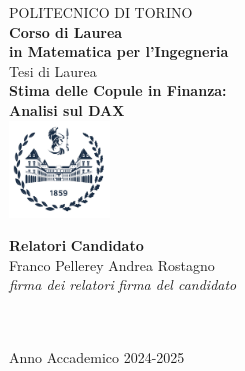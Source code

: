 \begin{titlepage}

\begin{center}

{\huge POLITECNICO DI TORINO}\\[1.5cm]
\textbf{Corso di Laurea\\in Matematica per l'Ingegneria}\\[3cm]

{\Large Tesi di Laurea}\\[1cm]
\textbf{\LARGE Stima delle Copule in Finanza:\\ Analisi sul DAX  }\\[2cm]
\includegraphics[width=0.2\textwidth]{./Pictures/logo_polito_2021.jpg}
\vspace{4cm}

\customfont{}

\begin{minipage}{0.85\textwidth}
\begin{flushleft}\large
\textbf{Relatori} \hfill \textbf{Candidato}\\
Franco Pellerey \hfill Andrea Rostagno\\
\textit{firma dei relatori} \hfill \textit{firma del candidato}\\[0.35cm]
\hfill \\
\fillin\ \hfill \fillin
\end{flushleft}
\end{minipage}

\vfill

Anno Accademico 2024-2025
\end{center}

\restoregeometry %

\end{titlepage}
